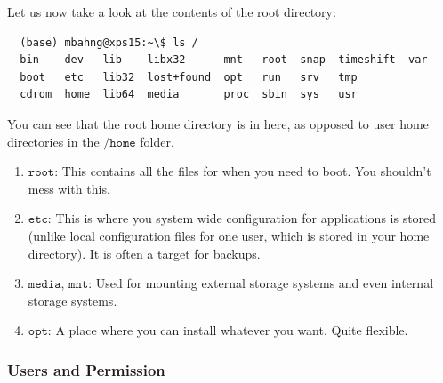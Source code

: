   Let us now take a look at the contents of the root directory: 
  \begin{lstlisting}
  (base) mbahng@xps15:~\$ ls /
  bin    dev   lib    libx32      mnt   root  snap  timeshift  var
  boot   etc   lib32  lost+found  opt   run   srv   tmp
  cdrom  home  lib64  media       proc  sbin  sys   usr
  \end{lstlisting}
  You can see that the root home directory is in here, as opposed to user home directories in the $\texttt{/home}$ folder. 
  \begin{enumerate}
      \item $\texttt{root}$: This contains all the files for when you need to boot. You shouldn't mess with this. 
      \item $\texttt{etc}$: This is where you system wide configuration for applications is stored (unlike local configuration files for one user, which is stored in your home directory). It is often a target for backups. 
      \item $\texttt{media}$, $\texttt{mnt}$: Used for mounting external storage systems and even internal storage systems. 
      \item $\texttt{opt}$: A place where you can install whatever you want. Quite flexible. 
  \end{enumerate}

\subsubsection{Users and Permission}

